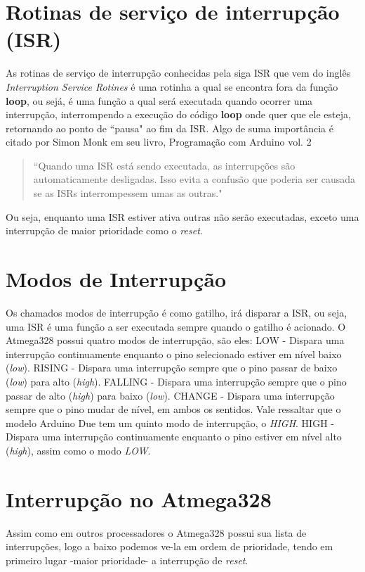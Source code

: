 \documentclass[a4paper,12pt,portuguese]{ufms-cpcx}
\begin{document}
\section{Rotinas de serviço de interrupção (ISR)}\label{isr}
As rotinas de serviço de interrupção conhecidas pela siga ISR que vem do inglês \textit{Interruption Service Rotines} é uma rotinha a qual se encontra fora da função \textbf{loop}, ou sejá, é uma função a qual será executada quando ocorrer uma interrupção, interrompendo a execução do código \textbf{loop} onde quer que ele esteja, retornando ao ponto de ``pausa" ao fim da ISR. Algo de suma importância é citado por Simon Monk em seu livro, Programação com Arduino vol. 2 \begin{quote}``Quando uma ISR está sendo executada, as interrupções são automaticamente desligadas. Isso evita a confusão que poderia ser causada se as ISRs interrompessem umas as outras."\end{quote}
Ou seja, enquanto uma ISR estiver ativa outras não serão executadas, exceto uma interrupção de maior prioridade como o \textit{reset}.

\section{Modos de Interrupção}\label{modointerrupcao}
Os chamados modos de interrupção é como gatilho, irá disparar a ISR, ou seja, uma ISR é uma função a ser executada sempre quando o gatilho é acionado. O Atmega328 possui quatro modos de interrupção, são eles:
LOW - Dispara uma interrupção continuamente enquanto o pino selecionado estiver em nível baixo (\textit{low}).
RISING - Dispara uma interrupção sempre que o pino passar de baixo (\textit{low}) para alto (\textit{high}).
FALLING - Dispara uma interrupção sempre que o pino passar de alto (\textit{high}) para baixo (\textit{low}).
CHANGE - Dispara uma interrupção sempre que o pino mudar de nível, em ambos os sentidos.
Vale ressaltar que o modelo Arduino Due tem um quinto modo de interrupção, o \textit{HIGH}.
HIGH - Dispara uma interrupção continuamente enquanto o pino estiver em nível alto (\textit{high}), assim como o modo \textit{LOW}.

\section{Interrupção no Atmega328}\label{interrupcao328}
Assim como em outros processadores o Atmega328 possui sua lista de interrupções, logo a baixo podemos ve-la em ordem de prioridade, tendo em primeiro lugar -maior prioridade- a interrupção de \textit{reset}.
\end{document}
